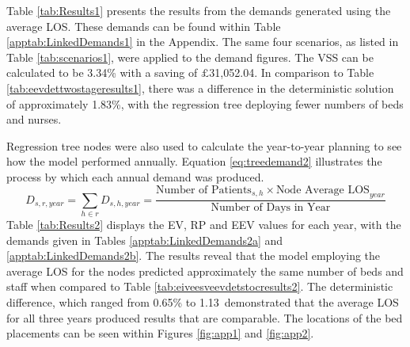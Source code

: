 \documentclass[../thesis.tex]{subfiles}
\begin{document}
Table \ref{tab:Results1} presents the results from the demands generated using the average LOS. These demands can be found within Table \ref{apptab:LinkedDemands1} in the Appendix. The same four scenarios, as listed in Table \ref{tab:scenarios1}, were applied to the demand figures. The VSS can be calculated to be 3.34\% with a saving of $\pounds$31,052.04. In comparison to Table \ref{tab:eevdettwostageresults1}, there was a difference in the deterministic solution of approximately 1.83\%, with the regression tree deploying fewer numbers of beds and nurses.
\begin{table}[h!]
    \centering{}
    \caption{The EV, RP and EEV values for the $x^\textnormal{bed}$, $u^\textnormal{bed}$, $x^\textnormal{staff}$, $u^\textnormal{staff}$ decision variables and objective function using the regression tree and the average LOS across all three years.}
    \label{tab:Results1}
\end{table}

Regression tree nodes were also used to calculate the year-to-year planning to see how the model performed annually. Equation \eqref{eq:treedemand2} illustrates the process by which each annual demand was produced.
\begin{equation}\label{eq:treedemand2}
        D_{s,r,year} = \sum\limits_{h \in r} D_{s,h,year} = \frac{\text{Number of Patients}_{s,h} \times {\text{Node Average LOS}}_{year}}{\text{Number of Days in Year}}
\end{equation}
Table \ref{tab:Results2} displays the EV, RP and EEV values for each year, with the demands given in Tables \ref{apptab:LinkedDemands2a} and \ref{apptab:LinkedDemands2b}. The results reveal that the model employing the average LOS for the nodes predicted approximately the same number of beds and staff when compared to Table \ref{tab:eiveesveevdetstocresults2}. The deterministic difference, which ranged from 0.65\% to 1.13\, demonstrated that the average LOS for all three years produced results that are comparable. The locations of the bed placements can be seen within Figures \ref{fig:app1} and \ref{fig:app2}.
\end{document}
